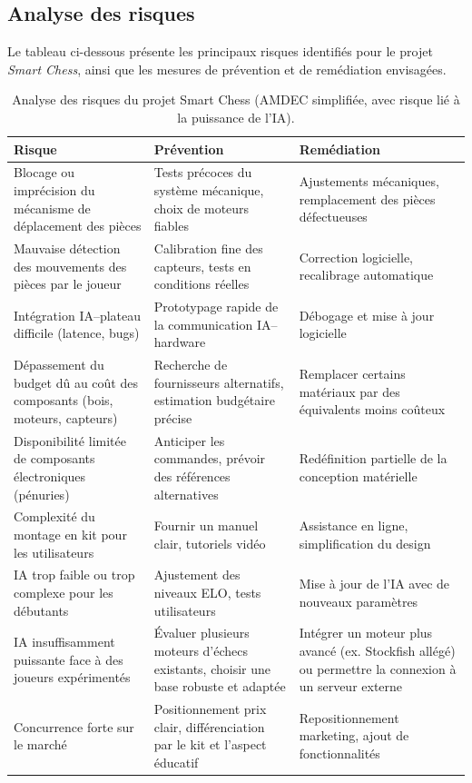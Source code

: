 \documentclass{article}
\begin{document}
\subsection{Analyse des risques}

Le tableau ci-dessous présente les principaux risques identifiés pour le projet \textit{Smart Chess}, ainsi que les mesures de prévention et de remédiation envisagées.

\begin{table}[H]
\centering
\renewcommand{\arraystretch}{1.3}
\begin{tabularx}{\textwidth}{|X|X|X|}
\hline
\textbf{Risque} & \textbf{Prévention} & \textbf{Remédiation} \\
\hline
Blocage ou imprécision du mécanisme de déplacement des pièces & Tests précoces du système mécanique, choix de moteurs fiables & Ajustements mécaniques, remplacement des pièces défectueuses \\
\hline
Mauvaise détection des mouvements des pièces par le joueur & Calibration fine des capteurs, tests en conditions réelles & Correction logicielle, recalibrage automatique \\
\hline
Intégration IA–plateau difficile (latence, bugs) & Prototypage rapide de la communication IA–hardware & Débogage et mise à jour logicielle \\
\hline
Dépassement du budget dû au coût des composants (bois, moteurs, capteurs) & Recherche de fournisseurs alternatifs, estimation budgétaire précise & Remplacer certains matériaux par des équivalents moins coûteux \\
\hline
Disponibilité limitée de composants électroniques (pénuries) & Anticiper les commandes, prévoir des références alternatives & Redéfinition partielle de la conception matérielle \\
\hline
Complexité du montage en kit pour les utilisateurs & Fournir un manuel clair, tutoriels vidéo & Assistance en ligne, simplification du design \\
\hline
IA trop faible ou trop complexe pour les débutants & Ajustement des niveaux ELO, tests utilisateurs & Mise à jour de l’IA avec de nouveaux paramètres \\
\hline
IA insuffisamment puissante face à des joueurs expérimentés & Évaluer plusieurs moteurs d’échecs existants, choisir une base robuste et adaptée & Intégrer un moteur plus avancé (ex. Stockfish allégé) ou permettre la connexion à un serveur externe \\
\hline
Concurrence forte sur le marché & Positionnement prix clair, différenciation par le kit et l’aspect éducatif & Repositionnement marketing, ajout de fonctionnalités \\
\hline
\end{tabularx}
\caption{Analyse des risques du projet Smart Chess (AMDEC simplifiée, avec risque lié à la puissance de l’IA).}
\end{table}
\end{document}
